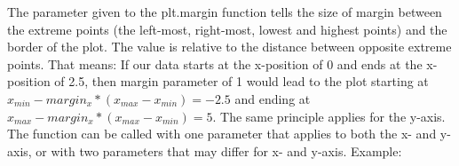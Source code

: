 The parameter given to the plt.margin function tells the size of margin between the extreme points (the left-most, right-most, lowest and highest points) and the border of the plot. The value is relative to the distance between opposite extreme points. That means: If our data starts at the x-position of 0 and ends at the x-position of 2.5, then margin parameter of 1 would lead to the plot starting at $x_{min}-margin_x*(x_{max}-x_{min}) = -2.5$ and ending at $x_{max}-margin_x*(x_{max}-x_{min}) = 5$. The same principle applies for the y-axis. The function can be called with one parameter that applies to both the x- and y-axis, or with two parameters that may differ for x- and y-axis.
Example:
